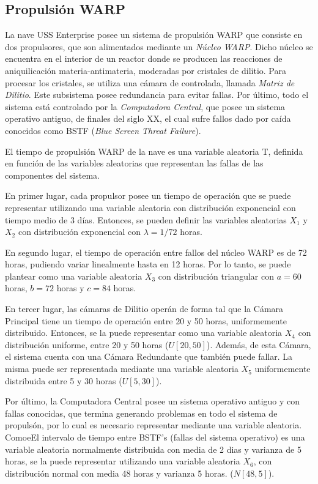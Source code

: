 \documentclass{sig-alternate}
\begin{document}
\subsection{Propulsi\'on WARP}
\par
La nave USS Enterprise posee un sistema de propulsi\'on WARP que consiste en dos propulsores, que son alimentados  mediante un \emph{N\'ucleo WARP}. Dicho n\'ucleo se encuentra en el interior de un reactor donde se producen las reacciones de aniquilicaci\'on materia-antimateria, moderadas por cristales de dilitio. Para procesar los cristales, se utiliza una c\'amara de 	controlada, llamada \emph{Matriz de Dilitio}. Este subsistema posee redundancia para evitar fallas. Por \'ultimo, todo el sistema est\'a controlado por la \emph{Computadora Central}, que posee un sistema operativo antiguo, de finales del siglo XX, el cual sufre fallos dado por ca\'ida conocidos como BSTF (\emph{Blue Screen Threat Failure}).
\par
El tiempo de propulsi\'on WARP de la nave es una variable aleatoria T, definida en funci\'on de las variables aleatorias que representan las fallas de las componentes del sistema.
\par
En primer lugar, cada propulsor posee un tiempo de operaci\'on que se puede representar utilizando una variable aleatoria con distribuci\'on exponencial con tiempo medio de 3 d\'ias. Entonces, se pueden definir las variables aleatorias $X_1$ y $X_2$ con distribuci\'on exponencial con $\lambda=1/72$ horas.
\par
En segundo lugar, el tiempo de operaci\'on entre fallos del n\'ucleo WARP es de 72 horas, pudiendo variar linealmente hasta en 12 horas. Por lo tanto, se puede plantear como una variable aleatoria $X_3$ con distribuci\'on triangular con $a = 60$ horas, $b = 72$ horas y $c = 84$ horas.
\par
En tercer lugar, las c\'amaras de Dilitio oper\'an de forma tal que la C\'amara Principal tiene un tiempo de operaci\'on entre 20 y 50 horas, uniformemente distribuido. Entonces, se la puede representar como una variable aleatoria $X_4$ con distribuci\'on uniforme, entre 20 y 50 horas ($U[20,50]$). Adem\'as, de esta C\'amara, el sistema cuenta con una C\'amara Redundante que tambi\'en puede fallar. La misma puede ser representada mediante una variable aleatoria $X_5$ uniformemente distribuida entre 5 y 30 horas ($U[5,30]$).
\par
Por \'ultimo, la Computadora Central posee un sistema operativo antiguo y con fallas conocidas, que termina generando problemas en todo el sistema de propuls\'on, por lo cual es necesario representar mediante una variable aleatoria. ComoeEl intervalo de tiempo entre BSTF’s (fallas del sistema operativo) es una variable aleatoria normalmente distribuida con media de 2 dias y varianza de 5 horas, se la puede representar utilizando una variable aleatoria $X_6$, con distribuci\'on normal con media 48 horas y varianza 5 horas. ($N[48,5]$).
\end{document}
